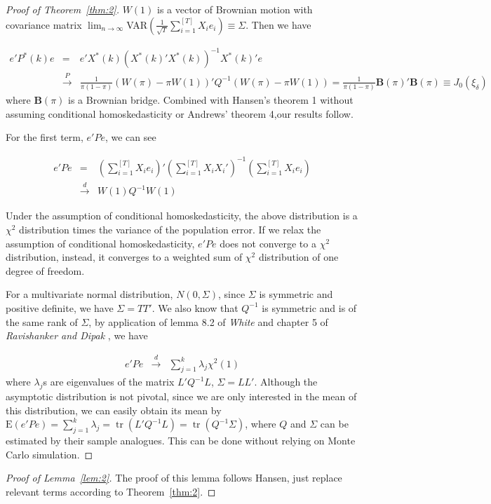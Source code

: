\documentclass[a4paper,12pt]{article}
\newcommand{\jian}{\sum_{i=1}^{[T]}}
\newcommand{\rn}{\frac{1}{\sqrt{T}}}
\DeclareMathOperator{\tr}{tr}
\begin{document}
\begin{proof}[Proof of Theorem~\ref{thm:2}]
\noindent $W(1)$ is a vector of Brownian motion with covariance matrix $\lim_{n\to\infty}$VAR$(\rn\jian X_i e_i)\equiv\Sigma$. Then we have

\begin{eqnarray*}
e'P^{*}(k)e & = & e'X^{*}(k)(X^{*}(k)'X^{*}(k))^{-1}X^{*}(k)'e \\
            & \stackrel{P}{\rightarrow} & \frac{1}{\pi(1-\pi)} (W(\pi) - \pi W(1))'Q^{-1}(W(\pi) - \pi W(1)) =  \frac{1}{\pi(1-\pi)} \mathbf{B}(\pi)'\mathbf{B}(\pi)
             \equiv J_0(\xi_{\delta})
\end{eqnarray*}
where $\mathbf{B}(\pi)$ is a Brownian bridge. Combined with Hansen's \cite{hansen2009averaging} theorem 1 without assuming conditional homoskedasticity or Andrews' \cite{andrews93} theorem 4,our results follow.

For the first term, $e'Pe$, we can see

\begin{eqnarray*}
e'Pe & = & (\jian X_i e_i)'(\jian X_i X_i')^{-1}(\jian X_i e_i) \\
     & \stackrel{d}{\rightarrow} & W(1) Q^{-1} W(1)
\end{eqnarray*}

Under the assumption of conditional homoskedasticity, the above distribution is a $\chi^2$ distribution times the variance of the population error. If we relax the assumption of conditional homoskedasticity, $e'Pe$ does not converge to a $\chi^2$ distribution, instead, it converges to a weighted sum of $\chi^2$ distribution of one degree of freedom.

For a multivariate normal distribution, $N(0,\Sigma)$, since $\Sigma$ is symmetric and positive definite, we have $\Sigma = TT'$. We also know that $Q^{-1}$ is symmetric and is of the same rank of $\Sigma$,
by application of lemma 8.2 of \emph{White} \cite{white_mle_textbook} and chapter 5 of \emph{Ravishanker and Dipak} \cite{linear_model_textbook}, we have

\begin{eqnarray*}
e'Pe & \stackrel{d}{\rightarrow} & \sum_{j=1}^{k} \lambda_j \chi^2(1)
\end{eqnarray*}
where $\lambda_j$s are eigenvalues of the matrix $L'Q^{-1}L$, $\Sigma = LL'$. Although the asymptotic distribution is not pivotal, since we are only interested in the mean of this distribution, we can easily obtain its mean by $\mathrm{E}(e'Pe) = \sum_{j=1}^{k} \lambda_j = \tr{(L'Q^{-1}L)} = \tr{(Q^{-1} \Sigma)}$, where $Q$ and $\Sigma$ can be estimated by their sample analogues. This can be done without relying on Monte Carlo simulation.
\end{proof}
\begin{proof}[Proof of Lemma~\ref{lem:2}]
The proof of this lemma follows Hansen\cite{hansen2009averaging}, just replace relevant terms according to Theorem~\ref{thm:2}.
\end{proof}


\end{document}
